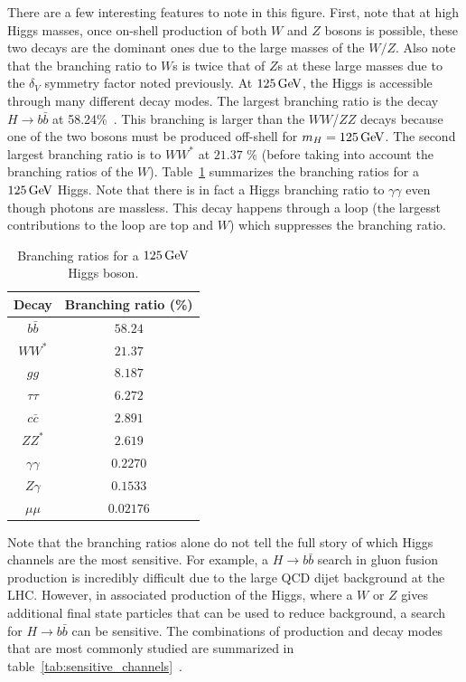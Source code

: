 There are a few interesting features to note in this figure. First, note that at high Higgs masses, once on-shell production of both $W$ and $Z$ bosons is possible, these two decays are the dominant ones due to the large masses of the $W/Z$. Also note that the branching ratio to $W$s is twice that of $Z$s at these large masses due to the $\delta_V$ symmetry factor noted previously. At $125 \GeV$, the Higgs is accessible through many different decay modes. The largest branching ratio is the decay $H\to b\bar{b}$ at 58.24\%~\cite{LHCXSWG}. This branching is larger than the $WW$/$ZZ$ decays because one of the two bosons must be produced off-shell for $m_H = 125 \GeV$. The second largest branching ratio is to $WW^*$ at $21.37$ \% (before taking into account the branching ratios of the $W$). Table~\ref{tab:Higgs_BR} summarizes the branching ratios for a $125 \GeV$ Higgs. Note that there is in fact a Higgs branching ratio to $\gamma\gamma$ even though photons are massless. This decay happens through a loop (the largesst contributions to the loop are top and $W$) which suppresses the branching ratio. 

\begin{table}[h!]
\centering
\captionsetup{justification=centering}

\hspace{-10pt}
\begin{tabular}{|c|c|}
\hline
Decay & Branching ratio (\%) \\ \hline
$b\bar{b}$ & $58.24$ \\ \hline
$WW^*$ & $21.37$ \\ \hline
$gg$ & $8.187$ \\ \hline
$\tau\tau$ & $6.272$ \\ \hline
$c\bar{c}$ & $2.891$ \\ \hline
$ZZ^*$ & $2.619$ \\ \hline
$\gamma\gamma$ & $0.2270$ \\ \hline
$Z\gamma$ & $0.1533$ \\ \hline
$\mu\mu$ & $0.02176$ \\ \hline
\end{tabular}

\caption{
Branching ratios for a $125 \GeV$ Higgs boson\cite{LHCXSWG}. 
}
\label{tab:Higgs_BR}
\end{table}


Note that the branching ratios alone do not tell the full story of which Higgs channels are the most sensitive. For example, a $H\to b\bar{b}$ search in gluon fusion production is incredibly difficult due to the large QCD dijet background at the LHC. However, in associated production of the Higgs, where a $W$ or $Z$ gives additional final state particles that can be used to reduce background, a search for $H\to b\bar{b}$ can be sensitive. The combinations of production and decay modes that are most commonly studied are summarized in table~\ref{tab:sensitive_channels}~\cite{Tully}.


